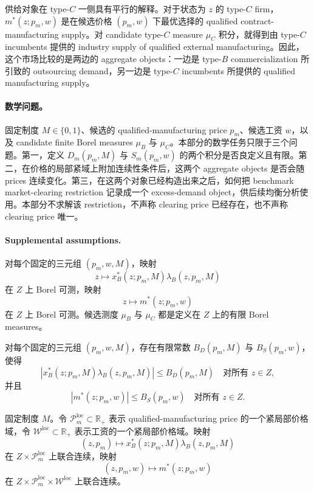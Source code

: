 供给对象在 type-$C$ 一侧具有平行的解释。对于状态为 $z$ 的 type-$C$ firm，$m^*(z;p_m,w)$ 是在候选价格 $(p_m,w)$ 下最优选择的 qualified contract-manufacturing supply。对 candidate type-$C$ measure $\mu_C$ 积分，就得到由 type-$C$ incumbents 提供的 industry supply of qualified external manufacturing。因此，这个市场比较的是两边的 aggregate objects：一边是 type-$B$ commercialization 所引致的 outsourcing demand，另一边是 type-$C$ incumbents 所提供的 qualified manufacturing supply。

\paragraph{数学问题。}
固定制度 $M\in\{0,1\}$、候选的 qualified-manufacturing price $p_m$、候选工资 $w$，以及 candidate finite Borel measures $\mu_B$ 与 $\mu_C$。本部分的数学任务只限于三个问题。第一，定义 $D_m(p_m,M)$ 与 $S_m(p_m,w)$ 的两个积分是否良定义且有限。第二，在价格的局部紧域上附加连续性条件后，这两个 aggregate objects 是否会随 prices 连续变化。第三，在这两个对象已经构造出来之后，如何把 benchmark market-clearing restriction 记录成一个 excess-demand object，供后续均衡分析使用。本部分不求解该 restriction，不声称 clearing price 已经存在，也不声称 clearing price 唯一。

\paragraph{Supplemental assumptions.}
\begin{assumption}[可测性与候选测度有限性]\label{ass:p6:cm-meas}
对每个固定的三元组 $(p_m,w,M)$，映射
\[
z\mapsto x_B^*(z;p_m,M)\lambda_B(z,p_m,M)
\]
在 $Z$ 上 Borel 可测，映射
\[
z\mapsto m^*(z;p_m,w)
\]
在 $Z$ 上 Borel 可测。候选测度 $\mu_B$ 与 $\mu_C$ 都是定义在 $Z$ 上的有限 Borel measures。
\end{assumption}

\begin{assumption}[固定候选价格下的有界性]\label{ass:p6:cm-bound}
对每个固定的三元组 $(p_m,w,M)$，存在有限常数 $B_D(p_m,M)$ 与 $B_S(p_m,w)$，使得
\[
\left|x_B^*(z;p_m,M)\lambda_B(z,p_m,M)\right|\le B_D(p_m,M)
\quad\text{对所有 } z\in Z,
\]
并且
\[
\left|m^*(z;p_m,w)\right|\le B_S(p_m,w)
\quad\text{对所有 } z\in Z.
\]
\end{assumption}

\begin{assumption}[紧局部价格域上的联合连续性]\label{ass:p6:cm-cont}
固定制度 $M$。令 $\mathcal P_m^{\mathrm{loc}}\subset\mathbb R_+$ 表示 qualified-manufacturing price 的一个紧局部价格域，令 $\mathcal W^{\mathrm{loc}}\subset\mathbb R_+$ 表示工资的一个紧局部价格域。映射
\[
(z,p_m)\mapsto x_B^*(z;p_m,M)\lambda_B(z,p_m,M)
\]
在 $Z\times\mathcal P_m^{\mathrm{loc}}$ 上联合连续，映射
\[
(z,p_m,w)\mapsto m^*(z;p_m,w)
\]
在 $Z\times\mathcal P_m^{\mathrm{loc}}\times\mathcal W^{\mathrm{loc}}$ 上联合连续。
\end{assumption}

